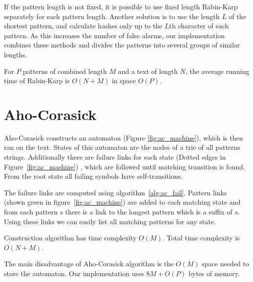 \documentclass[final]{beamer}
\begin{document}
\begin{poster}
If the pattern length is not fixed, it is possible to use fixed length Rabin-Karp separately for each pattern length. Another solution is to use the length $L$ of the shortest pattern, and calculate hashes only up to the $L$th character of each pattern. As this increases the number of false alarms, our implementation combines these methods and divides the patterns into several groups of similar lengths.

For $P$ patterns of combined length $M$  and a text of length $N$, the average running time of Rabin-Karp is $O(N+M)$ in space $O(P)$.


\section{Aho-Corasick}

Aho-Corasick constructs an automaton (Figure \ref{fig:ac_machine}), which is then ran on the text.
States of this automaton are the nodes of a trie of all patterns strings.
Additionally there are failure links for each state (Dotted edges in Figure~\ref{fig:ac_machine})
, which are followed until matching transition is found. From the root state all failing symbols
have self-transitions.

\newcolumn

The failure links are computed using algorithm~\ref{alg:ac_fail}.
Pattern links (shown green in figure~\ref{fig:ac_machine}) are added to each
matching state and from each pattern $s$ there is a link to the longest pattern which
is a suffix of $s$.
Using these links we can easily list all matching patterns for
any state.

Construction algorithm has time complexity $O(M)$. Total time complexity is $O(N+M)$.

\vspace{5mm}

The main disadvantage of Aho-Corasick algorithm is the $O(M)$ space needed to store the automaton.
Our implementation uses $8M+O(P)$ bytes of memory.

%


\end{poster}
\end{document}
